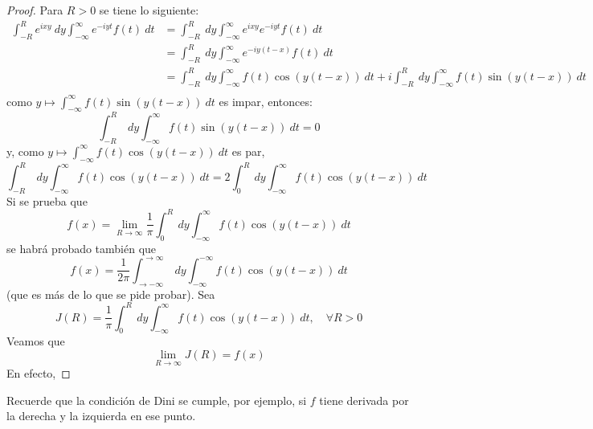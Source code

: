 \documentclass[12pt]{report}
\theoremstyle{largebreak}
\begin{document}
    \begin{proof}
        Para $R>0$ se tiene lo siguiente:
        \begin{equation*}
            \begin{split}
                \int_{ -R}^{ R}e^{ixy}\:dy\int_{-\infty}^\infty e^{ -iyt}f(t)\:dt&=\int_{ -R}^{ R}\:dy\int_{-\infty}^\infty e^{ixy}e^{ -iyt}f(t)\:dt\\
                &=\int_{ -R}^{ R}\:dy\int_{-\infty}^\infty e^{ -iy(t-x)}f(t)\:dt\\
                &=\int_{ -R}^{ R}\:dy\int_{-\infty}^\infty f(t)\cos(y(t-x))\:dt+i\int_{ -R}^{ R}\:dy\int_{-\infty}^\infty f(t)\sin(y(t-x))\:dt\\
            \end{split}
        \end{equation*}
        como $y\mapsto\int_{-\infty}^\infty f(t)\sin(y(t-x))\:dt$ es impar, entonces:
        \begin{equation*}
            \int_{ -R}^{ R}\:dy\int_{-\infty}^\infty f(t)\sin(y(t-x))\:dt=0
        \end{equation*}
        y, como $y\mapsto\int_{-\infty}^\infty f(t)\cos(y(t-x))\:dt$ es par,
        \begin{equation*}
            \int_{ -R}^{ R}\:dy\int_{-\infty}^\infty f(t)\cos(y(t-x))\:dt=2\int_{0}^{ R}\:dy\int_{-\infty}^\infty f(t)\cos(y(t-x))\:dt
        \end{equation*}
        Si se prueba que
        \begin{equation*}
            f(x)=\lim_{ R\rightarrow\infty}\frac{1}{\pi}\int_{0}^{ R}\:dy\int_{-\infty}^\infty f(t)\cos(y(t-x))\:dt
        \end{equation*}
        se habrá probado también que
        \begin{equation*}
            f(x)=\frac{1}{2\pi}\int_{ \rightarrow-\infty}^{\rightarrow\infty}\:dy\int_{ -\infty}^{ -\infty}f(t)\cos(y(t-x))\:dt
        \end{equation*}
        (que es más de lo que se pide probar). Sea
        \begin{equation*}
            J(R)=\frac{1}{\pi}\int_0^R\:dy\int_{-\infty}^\infty f(t)\cos(y(t-x))\:dt,\quad\forall R>0
        \end{equation*}
        Veamos que
        \begin{equation*}
            \lim_{ R\rightarrow\infty}J(R)=f(x)
        \end{equation*}
        En efecto, 
    \end{proof}

    \begin{obs}
        Recuerde que la condición de Dini se cumple, por ejemplo, si $f$ tiene derivada por la derecha y la izquierda en ese punto.
    \end{obs}
\end{document}
